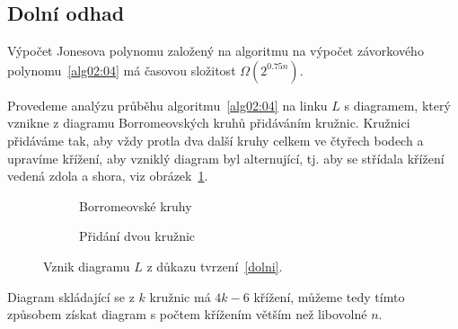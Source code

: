 \subsection{Dolní odhad}

\begin{tvrz} \label{dolni}
Výpočet Jonesova polynomu založený na algoritmu na výpočet závorkového polynomu~\ref{alg02:04} má časovou složitost  $\Omega(2^{0.75 n})$.
\end{tvrz}

\begin{dukaz}
Provedeme analýzu průběhu algoritmu~\ref{alg02:04} na linku $L$ s diagramem, který vznikne z diagramu Borromeovských kruhů přidáváním kružnic. Kružnici přidáváme tak, aby vždy protla dva další kruhy celkem ve čtyřech bodech a upravíme křížení, aby vzniklý diagram byl alternující, tj. aby se střídala křížení vedená zdola a shora, viz obrázek~\ref{borro}.

\begin{figure}[h]  

\centering 
\begin{subfigure}[t]{0.4\linewidth}\centering
{} 
\caption{Borromeovské kruhy} 
\end{subfigure}
\begin{subfigure}[t]{0.4\linewidth}\centering
{}
\caption{Přidání dvou kružnic}
\end{subfigure}
\caption{Vznik diagramu $L$ z důkazu tvrzení~\ref{dolni}.} \label{borro}
\end{figure}  


Diagram skládající se z $k$ kružnic má $4k-6$ křížení, můžeme tedy tímto způsobem získat diagram s počtem křížením větším než libovolné $n$.


\end{dukaz}
